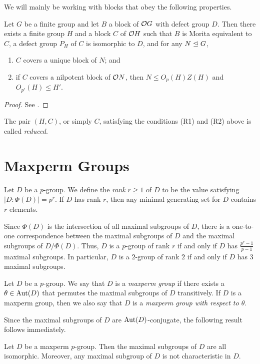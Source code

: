 \documentclass[bysection, amsart]{standard}
\begin{document}

We will mainly be working with blocks that obey the following properties.
\begin{proposition} \label{prp:reduced}
    Let $G$ be a finite group and let $B$ a block of $\mathcal{O} G$ with defect group $D$. Then there exists a finite group $H$ and a block $C$ of $\mathcal{O} H$ such that $B$ is Morita equivalent to $C$, a defect group $P_H$ of $C$ is isomorphic to $D$, and for any $N \trianglelefteq G$,
    \begin{enumerate}[label=(R\arabic*)]
        \item $C$ covers a unique block of $N$; and
        \item if $C$ covers a nilpotent block of $\mathcal{O} N$, then $N \leq O_p(H) Z(H)$ and $O_{p'}(H) \leq H'$.
    \end{enumerate}
\end{proposition}
\begin{proof}
    See \cite[Proposition 6.1]{paper:reduced-blocks}.
\end{proof}
\noindent The pair $(H, C)$, or simply $C$, satisfying the conditions (R1) and (R2) above is called \emph{reduced}.

\section{Maxperm Groups} \label{sec:maxperm}
Let $D$ be a $p$-group. We define the \emph{rank} $r \geq 1$ of $D$ to be the value satisfying $|D : \Phi(D)| = p^r$. If $D$ has rank $r$, then any minimal generating set for $D$ contains $r$ elements.

Since $\Phi(D)$ is the intersection of all maximal subgroups of $D$, there is a one-to-one correspondence between the maximal subgroups of $D$ and the maximal subgroups of $D/\Phi(D)$. Thus, $D$ is a $p$-group of rank $r$ if and only if $D$ has $\frac{p^r-1}{p-1}$ maximal subgroups. In particular, $D$ is a $2$-group of rank $2$ if and only if $D$ has $3$ maximal subgroups.

\begin{definition}
    Let $D$ be a $p$-group. We say that $D$ is a \emph{maxperm group} if there exists a $\theta \in \operatorname{Aut}(D)$ that permutes the maximal subgroups of $D$ transitively. If $D$ is a maxperm group, then we also say that $D$ is a \emph{maxperm group with respect to $\theta$}.
\end{definition}
Since the maximal subgroups of $D$ are $\operatorname{Aut}(D)$-conjugate, the following result follows immediately.
\begin{lemma} \label{lm:maxperm-max-iso}
    Let $D$ be a maxperm $p$-group. Then the maximal subgroups of $D$ are all isomorphic. Moreover, any maximal subgroup of $D$ is not characteristic in $D$.
\end{lemma}
\end{document}
